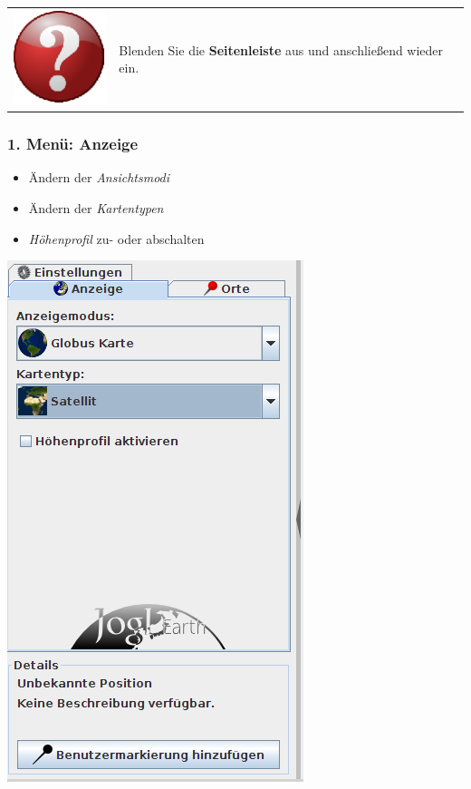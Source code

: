 \documentclass[10pt]{scrreprt}
\newcommand{\textref}[1]{\mbox{\raisebox{0.1ex}{\small$\rightarrow$ }\textit{#1}}}
\begin{document}
\vspace{3mm}
\begin{tabular}{>{\centering \arraybackslash}m{1cm} m{14cm}}
\includegraphics[scale=0.5]{images/quest.eps} & Blenden Sie die \textbf{Seitenleiste} aus und anschließend wieder ein.
\end{tabular}

\vspace{5mm}
\subsubsection{1. Menü: Anzeige} 

\begin{minipage}[t]{9cm}
\vspace{-40mm}
	\begin{itemize}
	\item Ändern der \textref{Ansichtsmodi}
	\item Ändern der \textref{Kartentypen}
	\item \textref{Höhenprofil} zu- oder abschalten
	\end{itemize}
\end{minipage}
\begin{minipage}{7cm}
\centering
\includegraphics[scale=0.4]{images/anzeige_tab.png}
\end{minipage}
\end{document}
